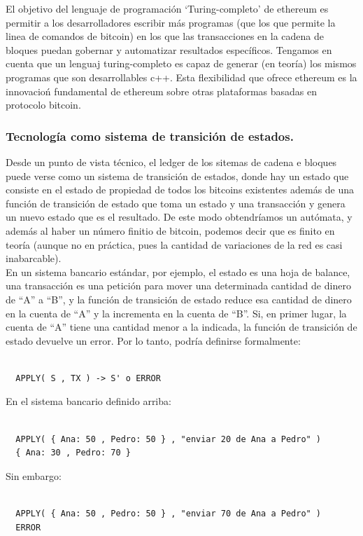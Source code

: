 \documentclass[11pt,a4paper]{article}
\begin{document}
El objetivo del lenguaje de programación ‘Turing-completo’ de ethereum es permitir a los
desarrolladores escribir más programas (que los que permite la linea de comandos de bitcoin) en los que las transacciones en la cadena de bloques puedan gobernar y automatizar resultados específicos. Tengamos en cuenta que un lenguaj turing-completo es capaz de generar (en teoría) los mismos programas que son desarrollables c++. Esta flexibilidad que ofrece ethereum es  la innovacioń fundamental de ethereum sobre otras plataformas basadas en protocolo bitcoin.\\

\subsubsection{Tecnología como sistema de transición de estados.}

Desde un punto de vista técnico, el ledger de los sitemas de cadena e bloques puede verse como un sistema de transición de estados, donde hay un estado que consiste en el estado de propiedad de todos los bitcoins existentes además de una función de transición de estado que toma un estado y una transacción y genera un nuevo estado que es el resultado. De este modo obtendríamos un autómata, y además al haber un número finitio de bitcoin, podemos decir que es finito en teoría (aunque no en práctica, pues la cantidad de variaciones de la red es casi inabarcable).\\

En un sistema bancario estándar, por ejemplo, el estado es una hoja de balance, una transacción es una petición para mover una determinada cantidad de dinero de “A” a “B”, y la función de transición de estado reduce esa cantidad de dinero en la cuenta de “A” y la incrementa en la cuenta de “B”. Si, en primer lugar, la cuenta de “A” tiene una cantidad menor a la indicada, la función de transición de estado devuelve un error. Por lo tanto, podría definirse formalmente:
\begin{lstlisting}

  APPLY( S , TX ) -> S' o ERROR

\end{lstlisting}


En el sistema bancario definido arriba:
\begin{lstlisting}

  APPLY( { Ana: 50 , Pedro: 50 } , "enviar 20 de Ana a Pedro" ) 
  { Ana: 30 , Pedro: 70 }

\end{lstlisting}
Sin embargo:
\begin{lstlisting}

  APPLY( { Ana: 50 , Pedro: 50 } , "enviar 70 de Ana a Pedro" ) 
  ERROR

\end{lstlisting}
\end{document}
